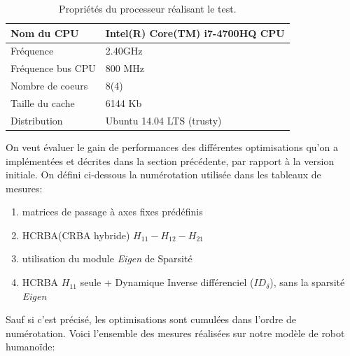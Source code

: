 \documentclass{report}
\begin{document}
\begin{flushleft}

\begin{table}[H]
\begin{center}
\begin{tabular}[H]{|l|l|}
\hline
Nom du CPU & Intel(R) Core(TM) i7-4700HQ CPU \\ \hline \hline
Fréquence & 2.40GHz \\ \hline
Fréquence bus CPU & 800 MHz \\ \hline
Nombre de coeurs & 8(4) \\ \hline
Taille du cache & 6144 Kb \\ \hline
Distribution & Ubuntu 14.04 LTS (trusty) \\
\hline
\end{tabular}
\caption[Table caption text]{Propriétés du processeur réalisant le test.}
\label{table:propriétésProc}
\end{center}
\end{table}

On veut évaluer le gain de performances des différentes optimisations qu'on a implémentées et décrites dans la section précédente, par rapport à la version initiale. On défini ci-dessous la numérotation utilisée dans les tableaux de mesures:
\begin{enumerate}
\item matrices de passage à axes fixes prédéfinis
\item HCRBA(CRBA hybride) $H_{11}-H_{12}-H_{21}$
\item utilisation du module \emph{Eigen} de Sparsité
\item HCRBA $H_{11}$ seule + Dynamique Inverse différenciel ($ID_\delta$), sans la sparsité \emph{Eigen}
\end{enumerate}

Sauf si c'est précisé, les optimisations sont cumulées dans l'ordre de numérotation. Voici l'ensemble des mesures réalisées sur notre modèle de robot humanoïde:\\


\end{flushleft}
\end{document}
